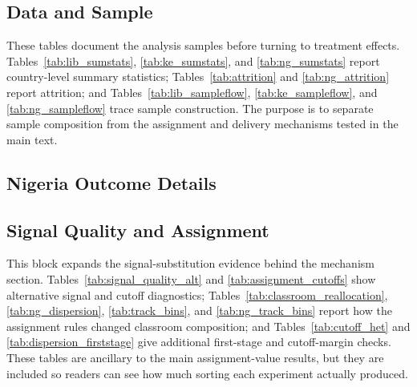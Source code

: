 \documentclass[11pt]{article}
\begin{document}
\subsection{Data and Sample}

These tables document the analysis samples before turning to treatment effects. Tables~\ref{tab:lib_sumstats}, \ref{tab:ke_sumstats}, and \ref{tab:ng_sumstats} report country-level summary statistics; Tables~\ref{tab:attrition} and \ref{tab:ng_attrition} report attrition; and Tables~\ref{tab:lib_sampleflow}, \ref{tab:ke_sampleflow}, and \ref{tab:ng_sampleflow} trace sample construction. The purpose is to separate sample composition from the assignment and delivery mechanisms tested in the main text.












\subsection{Nigeria Outcome Details}





\subsection{Signal Quality and Assignment}

This block expands the signal-substitution evidence behind the mechanism section. Tables~\ref{tab:signal_quality_alt} and \ref{tab:assignment_cutoffs} show alternative signal and cutoff diagnostics; Tables~\ref{tab:classroom_reallocation}, \ref{tab:ng_dispersion}, \ref{tab:track_bins}, and \ref{tab:ng_track_bins} report how the assignment rules changed classroom composition; and Tables~\ref{tab:cutoff_het} and \ref{tab:dispersion_firststage} give additional first-stage and cutoff-margin checks. These tables are ancillary to the main assignment-value results, but they are included so readers can see how much sorting each experiment actually produced.














\end{document}
